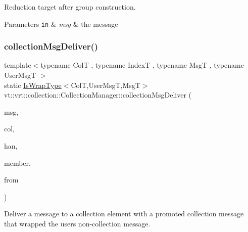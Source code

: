 Reduction target after group construction. 


\begin{DoxyParams}[1]{Parameters}
\mbox{\tt in}  & {\em msg} & the message \\
\hline
\end{DoxyParams}
\mbox{\label{structvt_1_1vrt_1_1collection_1_1_collection_manager_a8335935e585268654043862f312d9fa0}} 
\subsubsection{\texorpdfstring{collection\+Msg\+Deliver()}{collectionMsgDeliver()}\hspace{0.1cm}{\footnotesize\ttfamily [1/2]}}
{\footnotesize\ttfamily template$<$typename ColT , typename IndexT , typename MsgT , typename User\+MsgT $>$ \\
static \hyperlink{structvt_1_1vrt_1_1collection_1_1_collection_manager_a1f91c97ed52237c3a3576dfbbe87c8f8}{Is\+Wrap\+Type}$<$ColT,User\+MsgT,MsgT$>$ vt\+::vrt\+::collection\+::\+Collection\+Manager\+::collection\+Msg\+Deliver (\begin{DoxyParamCaption}\item[{MsgT $\ast$}]{msg,  }\item[{\hyperlink{structvt_1_1vrt_1_1collection_1_1_collection_base}{Collection\+Base}$<$ ColT, IndexT $>$ $\ast$}]{col,  }\item[{\hyperlink{namespacevt_af64846b57dfcaf104da3ef6967917573}{Handler\+Type}}]{han,  }\item[{bool}]{member,  }\item[{\hyperlink{namespacevt_a866da9d0efc19c0a1ce79e9e492f47e2}{Node\+Type}}]{from }\end{DoxyParamCaption})\hspace{0.3cm}{\ttfamily [static]}}



Deliver a message to a collection element with a promoted collection message that wrapped the user\textquotesingle{}s non-\/collection message. 


